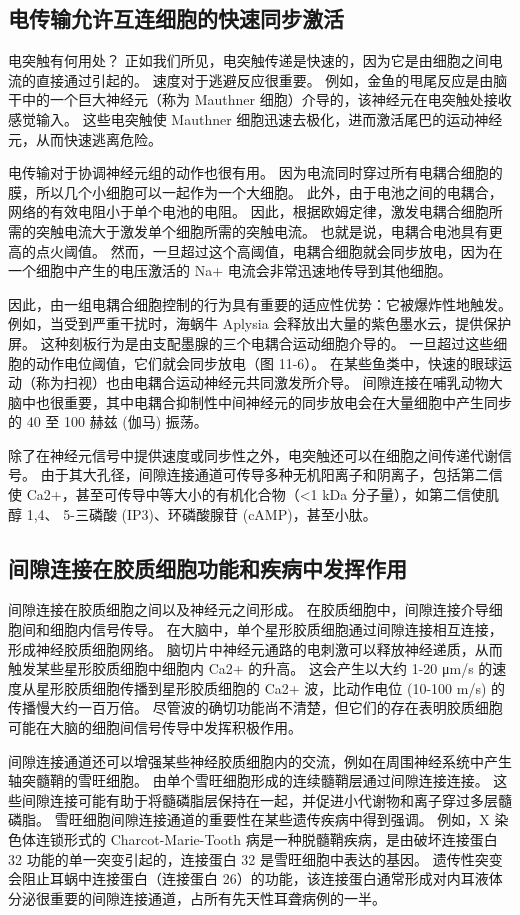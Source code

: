 \subsection{电传输允许互连细胞的快速同步激活}
电突触有何用处？ 
正如我们所见，电突触传递是快速的，因为它是由细胞之间电流的直接通过引起的。 
速度对于逃避反应很重要。 
例如，金鱼的甩尾反应是由脑干中的一个巨大神经元（称为 Mauthner 细胞）介导的，该神经元在电突触处接收感觉输入。 
这些电突触使 Mauthner 细胞迅速去极化，进而激活尾巴的运动神经元，从而快速逃离危险。


电传输对于协调神经元组的动作也很有用。 
因为电流同时穿过所有电耦合细胞的膜，所以几个小细胞可以一起作为一个大细胞。 
此外，由于电池之间的电耦合，网络的有效电阻小于单个电池的电阻。 
因此，根据欧姆定律，激发电耦合细胞所需的突触电流大于激发单个细胞所需的突触电流。 
也就是说，电耦合电池具有更高的点火阈值。 
然而，一旦超过这个高阈值，电耦合细胞就会同步放电，因为在一个细胞中产生的电压激活的 Na+ 电流会非常迅速地传导到其他细胞。


因此，由一组电耦合细胞控制的行为具有重要的适应性优势：它被爆炸性地触发。 
例如，当受到严重干扰时，海蜗牛 Aplysia 会释放出大量的紫色墨水云，提供保护屏。 
这种刻板行为是由支配墨腺的三个电耦合运动细胞介导的。 一旦超过这些细胞的动作电位阈值，它们就会同步放电（图 11-6）。 
在某些鱼类中，快速的眼球运动（称为扫视）也由电耦合运动神经元共同激发所介导。 
间隙连接在哺乳动物大脑中也很重要，其中电耦合抑制性中间神经元的同步放电会在大量细胞中产生同步的 40 至 100 赫兹 (伽马) 振荡。


除了在神经元信号中提供速度或同步性之外，电突触还可以在细胞之间传递代谢信号。 
由于其大孔径，间隙连接通道可传导多种无机阳离子和阴离子，包括第二信使 Ca2+，甚至可传导中等大小的有机化合物（<1 kDa 分子量），如第二信使肌醇 1,4、 5-三磷酸 (IP3)、环磷酸腺苷 (cAMP)，甚至小肽。


\subsection{间隙连接在胶质细胞功能和疾病中发挥作用}
间隙连接在胶质细胞之间以及神经元之间形成。 
在胶质细胞中，间隙连接介导细胞间和细胞内信号传导。 
在大脑中，单个星形胶质细胞通过间隙连接相互连接，形成神经胶质细胞网络。 
脑切片中神经元通路的电刺激可以释放神经递质，从而触发某些星形胶质细胞中细胞内 Ca2+ 的升高。 
这会产生以大约 1-20 μm/s 的速度从星形胶质细胞传播到星形胶质细胞的 Ca2+ 波，比动作电位 (10-100 m/s) 的传播慢大约一百万倍。 
尽管波的确切功能尚不清楚，但它们的存在表明胶质细胞可能在大脑的细胞间信号传导中发挥积极作用。


间隙连接通道还可以增强某些神经胶质细胞内的交流，例如在周围神经系统中产生轴突髓鞘的雪旺细胞。 
由单个雪旺细胞形成的连续髓鞘层通过间隙连接连接。 
这些间隙连接可能有助于将髓磷脂层保持在一起，并促进小代谢物和离子穿过多层髓磷脂。 
雪旺细胞间隙连接通道的重要性在某些遗传疾病中得到强调。
例如，X 染色体连锁形式的 Charcot-Marie-Tooth 病是一种脱髓鞘疾病，是由破坏连接蛋白 32 功能的单一突变引起的，连接蛋白 32 是雪旺细胞中表达的基因。 
遗传性突变会阻止耳蜗中连接蛋白（连接蛋白 26）的功能，该连接蛋白通常形成对内耳液体分泌很重要的间隙连接通道，占所有先天性耳聋病例的一半。


